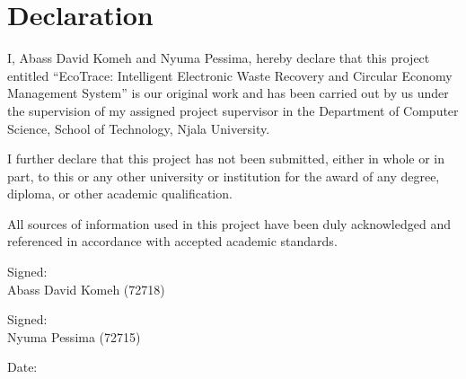 \chapter*{Declaration}

I, Abass David Komeh and Nyuma Pessima, hereby declare that this project entitled
``EcoTrace: Intelligent Electronic Waste Recovery and Circular Economy
Management System'' is our original work and has been carried out by us under the
supervision of my assigned project supervisor in the Department of Computer Science,
School of Technology, Njala University.

I further declare that this project has not been submitted, either in whole or in
part, to this or any other university or institution for the award of any degree, diploma,
or other academic qualification.

All sources of information used in this project have been duly acknowledged and
referenced in accordance with accepted academic standards.

\vspace{1.5cm}
\noindent Signed: \underline{\hspace{6cm}}\\[0.4cm]
Abass David Komeh (72718)

\vspace{1cm}
\noindent Signed: \underline{\hspace{6cm}}\\[0.4cm]
Nyuma Pessima (72715)

\vspace{1cm}
\noindent Date: \underline{\hspace{6cm}}
